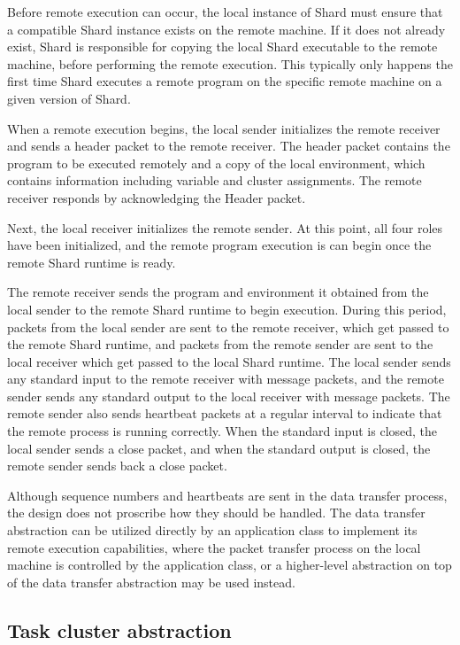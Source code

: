 \documentclass[oneside]{report}
\begin{document}
Before remote execution can occur, the local instance of Shard must ensure that a compatible Shard instance exists on the remote machine.
If it does not already exist, Shard is responsible for copying the local Shard executable to the remote machine, before performing the remote execution.
This typically only happens the first time Shard executes a remote program on the specific remote machine on a given version of Shard.

When a remote execution begins, the local sender initializes the remote receiver and sends a header packet to the remote receiver.
The header packet contains the program to be executed remotely and a copy of the local environment, which contains information including variable and cluster assignments.
The remote receiver responds by acknowledging the Header packet.

Next, the local receiver initializes the remote sender.
At this point, all four roles have been initialized, and the remote program execution is can begin once the remote Shard runtime is ready.

The remote receiver sends the program and environment it obtained from the local sender to the remote Shard runtime to begin execution.
During this period, packets from the local sender are sent to the remote receiver, which get passed to the remote Shard runtime, and packets from the remote sender are sent to the local receiver which get passed to the local Shard runtime.
The local sender sends any standard input to the remote receiver with message packets, and the remote sender sends any standard output to the local receiver with message packets.
The remote sender also sends heartbeat packets at a regular interval to indicate that the remote process is running correctly.
When the standard input is closed, the local sender sends a close packet, and when the standard output is closed, the remote sender sends back a close packet.

Although sequence numbers and heartbeats are sent in the data transfer process, the design does not proscribe how they should be handled.
The data transfer abstraction can be utilized directly by an application class to implement its remote execution capabilities, where the packet transfer process on the local machine is controlled by the application class, or a higher-level abstraction on top of the data transfer abstraction may be used instead.

\subsection{Task cluster abstraction}
\end{document}
